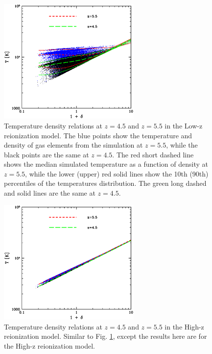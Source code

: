 \begin{figure}
\bc
\includegraphics[width=7cm]{f5.eps}
\caption{Temperature density relations at $z = 4.5$ and $z=5.5$ in the Low-z reionization model. The
blue points show the temperature and density of gas elements from the simulation at $z=5.5$, while
the black points are the same at $z=4.5$. The red short dashed line shows the median simulated temperature
as a function of density at $z=5.5$, while the lower (upper) red solid lines show the 10th (90th) percentiles
of the temperatures distribution. The green long dashed and solid lines are the same at $z=4.5$.}
\label{fig:tden_lowz}
\ec
\end{figure}

\begin{figure}
\bc
\includegraphics[width=7cm]{f6.eps}
\caption{Temperature density relations at $z = 4.5$ and $z=5.5$ in the High-z reionization model.
Similar to Fig. \ref{fig:tden_lowz}, except the results here are for the High-z reionization model.}
\label{fig:tden_hiz}
\ec
\end{figure}

